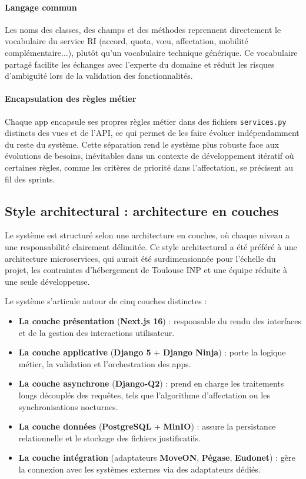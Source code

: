 \paragraph{Langage commun}

Les noms des classes, des champs et des méthodes reprennent directement le vocabulaire du service RI (accord, quota, vœu, affectation, mobilité complémentaire...), plutôt qu'un vocabulaire technique générique. Ce vocabulaire partagé facilite les échanges avec l'experte du domaine et réduit les risques d'ambiguïté lors de la validation des fonctionnalités.

\paragraph{Encapsulation des règles métier}

Chaque app encapsule ses propres règles métier dans des fichiers \texttt{services.py} distincts des vues et de l'API, ce qui permet de les faire évoluer indépendamment du reste du système. Cette séparation rend le système plus robuste face aux évolutions de besoins, inévitables dans un contexte de développement itératif où certaines règles, comme les critères de priorité dans l'affectation, se précisent au fil des sprints.

\subsection{Style architectural : architecture en couches}

Le système est structuré selon une architecture en couches, où chaque niveau a une responsabilité clairement délimitée. Ce style architectural a été préféré à une architecture microservices, qui aurait été surdimensionnée pour l'échelle du projet, les contraintes d'hébergement de Toulouse INP et une équipe réduite à une seule développeuse.

Le système s'articule autour de cinq couches distinctes :

\begin{itemize}
    \item \textbf{La couche présentation} (\textbf{Next.js 16}) : responsable du rendu des interfaces
    et de la gestion des interactions utilisateur.
    \item \textbf{La couche applicative} (\textbf{Django 5} + \textbf{Django Ninja}) : porte la logique métier, la validation
    et l'orchestration des apps.
    \item \textbf{La couche asynchrone} (\textbf{Django-Q2}) : prend en charge les traitements longs
    découplés des requêtes, tels que l'algorithme d'affectation ou les
    synchronisations nocturnes.
    \item \textbf{La couche données} (\textbf{PostgreSQL} + \textbf{MinIO}) : assure la persistance relationnelle et
    le stockage des fichiers justificatifs.
    \item \textbf{La couche intégration} (adaptateurs \textbf{MoveON}, \textbf{Pégase}, \textbf{Eudonet}) : gère la connexion avec les systèmes
    externes via des adaptateurs dédiés.
\end{itemize}

